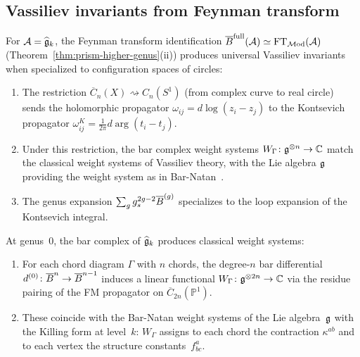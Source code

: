 \subsection{Vassiliev invariants from Feynman transform}
\label{subsec:vassiliev}

\begin{conjecture}\label{conj:vassiliev-bar}
For $\mathcal{A} = \widehat{\mathfrak{g}}_k$, the Feynman transform identification
$\overline{B}^{\mathrm{full}}(\mathcal{A}) \simeq \mathrm{FT}_{\mathcal{M}\mathrm{od}}(\mathcal{A})$
\textup{(}Theorem~\textup{\ref{thm:prism-higher-genus}(ii))}
produces universal Vassiliev invariants when specialized to
configuration spaces of circles:
\begin{enumerate}[label=\textup{(\roman*)}]
\item The restriction
  $\overline{C}_n(X) \rightsquigarrow C_n(S^1)$
  \textup{(}from complex curve to real circle\textup{)} sends the
  holomorphic propagator $\omega_{ij} = d\log(z_i - z_j)$ to the
  Kontsevich propagator $\omega_{ij}^K = \frac{1}{2\pi} d\arg(t_i - t_j)$.
\item Under this restriction, the bar complex weight systems
  $W_\Gamma\colon \mathfrak{g}^{\otimes n} \to \mathbb{C}$ match the
  classical weight systems of Vassiliev theory, with the
  Lie algebra $\mathfrak{g}$ providing the weight system as in
  Bar-Natan~\cite{BarNatan95}.
\item The genus expansion
  $\sum_g g_s^{2g-2} \overline{B}^{(g)}$ specializes to the
  loop expansion of the Kontsevich integral.
\end{enumerate}
\end{conjecture}

\begin{proposition}\label{prop:vassiliev-genus0}
At genus~$0$, the bar complex of $\widehat{\mathfrak{g}}_k$ produces
classical weight systems:
\begin{enumerate}[label=\textup{(\roman*)}]
\item For each chord diagram $\Gamma$ with $n$ chords, the
  degree-$n$ bar differential $d^{(0)}\colon \overline{B}^n \to \overline{B}^{n-1}$
  induces a linear functional
  $W_\Gamma\colon \mathfrak{g}^{\otimes 2n} \to \mathbb{C}$ via the residue
  pairing of the FM propagator on $\overline{C}_{2n}(\mathbb{P}^1)$.
\item These coincide with the Bar-Natan weight systems of the
  Lie algebra~$\mathfrak{g}$ with the Killing form at level~$k$: $W_\Gamma$
  assigns to each chord the contraction $\kappa^{ab}$ and to each
  vertex the structure constants~$f^a_{bc}$.
\end{enumerate}
\end{proposition}

